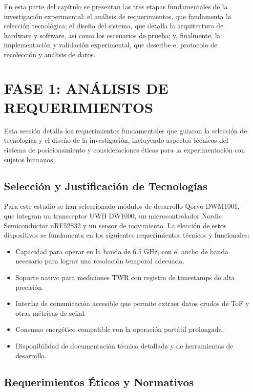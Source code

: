 En esta parte del capítulo se presentan las tres etapas fundamentales de la investigación experimental: el análisis de requerimientos, que fundamenta la selección tecnológica; el diseño del sistema, que detalla la arquitectura de hardware y software, así como los escenarios de prueba; y, finalmente, la implementación y validación experimental, que describe el protocolo de recolección y análisis de datos.

\section{FASE 1: ANÁLISIS DE REQUERIMIENTOS}
\label{sec:analisis_requerimientos}

Esta sección detalla los requerimientos fundamentales que guiaron la selección de tecnologías y el diseño de la investigación, incluyendo aspectos técnicos del sistema de posicionamiento y consideraciones éticas para la experimentación con sujetos humanos.

\subsection{Selección y Justificación de Tecnologías}
\label{subsec:seleccion_tecnologia}

Para este estudio se han seleccionado módulos de desarrollo Qorvo DWM1001, que integran un transceptor UWB DW1000, un microcontrolador Nordic Semiconductor nRF52832 y un sensor de movimiento. La elección de estos dispositivos se fundamenta en los siguientes requerimientos técnicos y funcionales:

\begin{itemize}
\item Capacidad para operar en la banda de 6.5 GHz, con el ancho de banda necesario para lograr una resolución temporal adecuada.
\item Soporte nativo para mediciones TWR con registro de timestamps de alta precisión.
\item Interfaz de comunicación accesible que permite extraer datos crudos de ToF y otras métricas de señal.
\item Consumo energético compatible con la operación portátil prolongada.
\item Disponibilidad de documentación técnica detallada y de herramientas de desarrollo.
\end{itemize}

\subsection{Requerimientos Éticos y Normativos}
\label{subsec:requerimientos_eticos}

